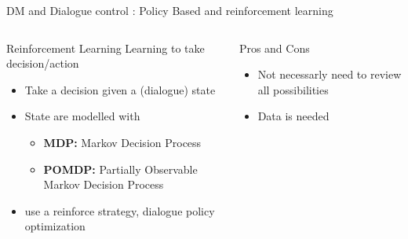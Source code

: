 \documentclass[10pt,aspectratio=169]{beamer}
\begin{document}
\begin{frame}{DM and Dialogue control : Policy Based and reinforcement learning}

    \begin{columns}
        \begin{column}{0.5\textwidth}
            \begin{block}{Reinforcement Learning}
                Learning to take decision/action 
                \begin{itemize}
                    \item Take a decision  given a (dialogue) state 
                    \item State are modelled with 
                        \begin{itemize}
                            \item \textbf{MDP:} Markov Decision Process \cite{levin-2000-stochastic}
                            \item \textbf{POMDP:} Partially Observable Markov Decision Process \cite{Young2006USINGPF}
                        \end{itemize}
                    \item use a reinforce strategy, dialogue policy optimization
                \end{itemize}
            \end{block}

        \end{column}
        \begin{column}{0.5\textwidth}
                        \begin{block}{Pros and Cons}
                \begin{itemize}
                    \item Not necessarly need to review all possibilities 
                    \item Data is needed 
                \end{itemize}
            \end{block}
        \end{column}
    \end{columns}
\end{frame}
\end{document}

